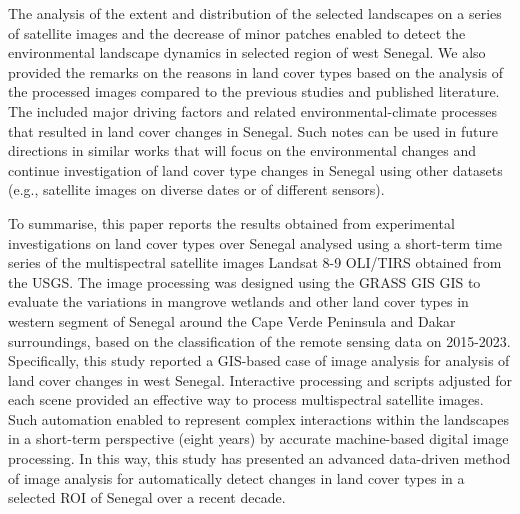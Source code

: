 \documentclass[earth,article,submit,pdftex,moreauthors]{Definitions/mdpi}
\begin{document}
The analysis of the extent and distribution of the selected landscapes on a series of satellite images and the decrease of minor patches enabled to detect the environmental landscape dynamics in selected region of west Senegal. We also provided the remarks on the reasons in land cover types based on the analysis of the processed images compared to the previous studies and published literature. The included major driving factors and related environmental-climate processes that resulted in land cover changes in Senegal. Such notes can be used in future directions in similar works that will focus on the environmental changes and continue investigation of land cover type changes in Senegal using other datasets (e.g., satellite images on diverse dates or of different sensors).

To summarise, this paper reports the results obtained from experimental investigations on land cover types over Senegal analysed using a short-term time series of the multispectral satellite images Landsat 8-9 OLI/TIRS obtained from the USGS. The image processing was designed using the GRASS GIS GIS to evaluate the variations in mangrove wetlands and other land cover types in western segment of Senegal around the Cape Verde Peninsula and Dakar surroundings, based on the classification of the remote sensing data on 2015-2023. Specifically, this study reported a GIS-based case of image analysis for analysis of land cover changes in west Senegal. Interactive processing and  scripts adjusted for each scene provided an effective way to process multispectral satellite images. Such automation enabled to represent complex interactions within the landscapes in a short-term perspective (eight years) by accurate machine-based digital image processing. In this way, this study has presented an advanced data-driven method of image analysis for automatically detect changes in land cover types in a selected ROI of Senegal over a recent decade.





\end{document}
